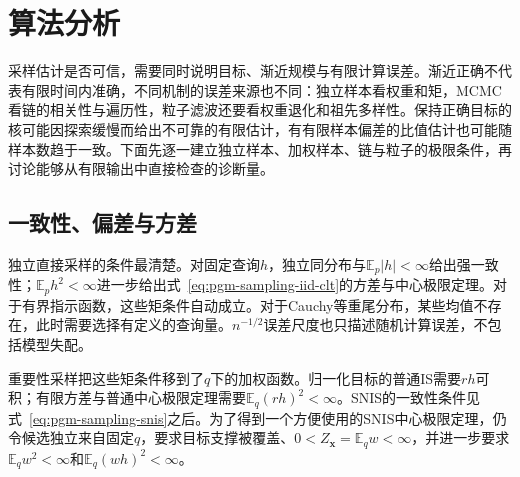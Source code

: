 \section{算法分析}
\label{sec:pgm-sampling-analysis}

采样估计是否可信，需要同时说明目标、渐近规模与有限计算误差。渐近正确不代表有限时间内准确，不同机制的误差来源也不同：独立样本看权重和矩，MCMC看链的相关性与遍历性，粒子滤波还要看权重退化和祖先多样性。保持正确目标的核可能因探索缓慢而给出不可靠的有限估计，有有限样本偏差的比值估计也可能随样本数趋于一致。下面先逐一建立独立样本、加权样本、链与粒子的极限条件，再讨论能够从有限输出中直接检查的诊断量。

\subsection{一致性、偏差与方差}
\label{sec:pgm-sampling-consistency}

独立直接采样的条件最清楚。对固定查询$h$，独立同分布与$\mathbb{E}_p|h|<\infty$给出强一致性；$\mathbb{E}_p h^2<\infty$进一步给出式~\eqref{eq:pgm-sampling-iid-clt}的方差与中心极限定理。对于有界指示函数，这些矩条件自动成立。对于Cauchy等重尾分布，某些均值不存在，此时需要选择有定义的查询量。$n^{-1/2}$误差尺度也只描述随机计算误差，不包括模型失配。

重要性采样把这些矩条件移到了$q$下的加权函数。归一化目标的普通IS需要$r h$可积；有限方差与普通中心极限定理需要$\mathbb{E}_q(rh)^2<\infty$。SNIS的一致性条件见式~\eqref{eq:pgm-sampling-snis}之后。为了得到一个方便使用的SNIS中心极限定理，仍令候选独立来自固定$q$，要求目标支撑被覆盖、$0<Z_{\bm x}=\mathbb E_qw<\infty$，并进一步要求$\mathbb{E}_q w^2<\infty$和$\mathbb{E}_q(wh)^2<\infty$。

